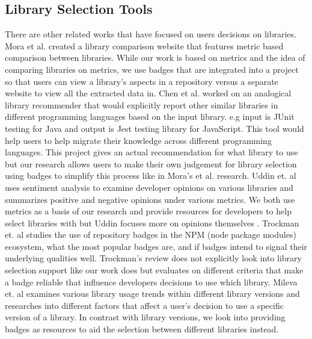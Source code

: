 \documentclass[12pt, letterpaper]{article}
\begin{document}
\subsection{Library Selection Tools}
There are other related works that have focused on users decisions on libraries. 
Mora et al. \cite{metrics, empiricalmetrics} created a library comparison website
that features metric based comparison between libraries. While our work is based on
metrics and the idea of comparing libraries on metrics, we use badges that are integrated into
a project so that users can view a library's aspects in a repository versus a separate
website to view all the extracted data in. 
Chen et al. \cite{analogical} worked on an analogical library recommender that would explicitly
report other similar libraries in different programming languages based on the input library.
e.g input is JUnit testing for Java and output is Jest testing library for JavaScript. 
This tool would help users to help migrate their knowledge across different programming languages.
This project gives an actual recommendation for what library to use but our research allows users to
make their own judgement for library selection using badges to simplify this process like in
Mora's et al. \cite{metrics, empiricalmetrics} research.
Uddin et. al \cite{opinerarticle} uses sentiment analysis to examine developer opinions on various libraries
and summarizes positive and negative opinions under various metrics. We both use metrics as a basis of
our research and provide resources for developers to help select libraries with but Uddin focuses more on
opinions themselves \cite{stackoverflow}.
Trockman et. al \cite{githubbadges} studies the use of repository badges in the NPM (node package modules)
ecosystem, what the most popular badges are, and if badges intend to signal their underlying qualities well.
Trockman's review does not explicitly look into library selection support like our work does but 
evaluates on different criteria that make a badge reliable that influence developers decisions
to use which library. Mileva et. al \cite{librarytrends} examines various library usage trends 
within different library versions and researches into different factors that affect a user's decision
to use a specific version of a library. In contrast with library versions, we look into providing badges
as resources to aid the selection between different libraries instead.


\end{document}
